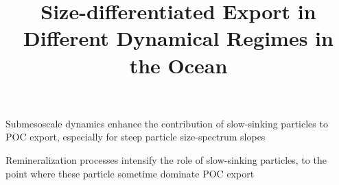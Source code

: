 \documentclass[article,linenumbers]{agujournal2018}
\begin{document}
	
	\title{Size-differentiated Export in Different Dynamical Regimes in the Ocean}
	
	
	
	\begin{keypoints}
		\item Submesoscale dynamics enhance the contribution of slow-sinking particles to POC export, especially for steep particle size-spectrum slopes
		\item Remineralization processes intensify the role of slow-sinking particles, to the point where these particle sometime dominate POC export
	\end{keypoints}
	
\end{document}
